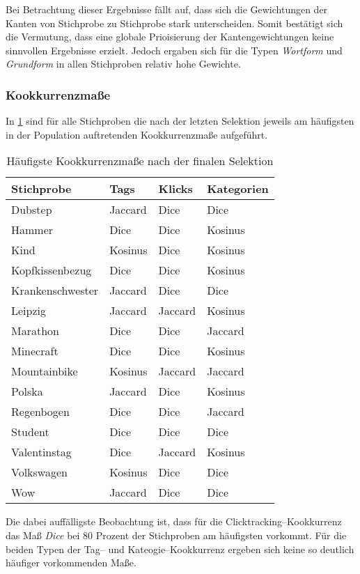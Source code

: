 Bei Betrachtung dieser Ergebnisse fällt auf, dass sich die Gewichtungen der Kanten von Stichprobe zu Stichprobe stark unterscheiden. Somit bestätigt sich die Vermutung, dass eine globale Prioisierung der Kantengewichtungen keine sinnvollen Ergebnisse erzielt. Jedoch ergaben sich für die Typen \emph{Wortform} und \emph{Grundform} in allen Stichproben relativ hohe Gewichte.

\subsubsection{Kookkurrenzmaße}

In \cref{tab:measures_each} sind für alle Stichproben die nach der letzten Selektion jeweils am häufigsten in der Population auftretenden Kookkurrenzmaße aufgeführt.

\begin{table}
\centering
\begin{tabular}{llll}
    \toprule
    Stichprobe & Tags & Klicks & Kategorien \\
    \midrule
    Dubstep & Jaccard & Dice & Dice \\
    Hammer & Dice & Dice & Kosinus \\
    Kind & Kosinus & Dice & Kosinus \\
    Kopfkissenbezug & Dice & Dice & Kosinus \\
    Krankenschwester & Jaccard & Dice & Dice \\
    Leipzig & Jaccard & Jaccard & Kosinus \\
    Marathon & Dice & Dice & Jaccard \\
    Minecraft & Dice & Dice & Kosinus \\
    Mountainbike & Kosinus & Jaccard & Jaccard \\
    Polska & Jaccard & Dice & Kosinus \\
    Regenbogen & Dice & Dice & Jaccard \\
    Student & Dice & Dice & Dice \\
    Valentinstag & Dice & Jaccard & Kosinus \\
    Volkswagen & Kosinus & Dice & Dice \\
    Wow & Jaccard & Dice & Dice \\
    \bottomrule
\end{tabular}
\caption{Häufigste Kookkurrenzmaße nach der finalen Selektion}
\label{tab:measures_each}
\end{table}

Die dabei auffälligste Beobachtung ist, dass für die Clicktracking--Kookkurrenz das Maß \emph{Dice} bei \num{80} Prozent der Stichproben am häufigsten vorkommt. Für die beiden Typen der Tag-- und Kateogie--Kookkurrenz ergeben sich keine so deutlich häufiger vorkommenden Maße.

